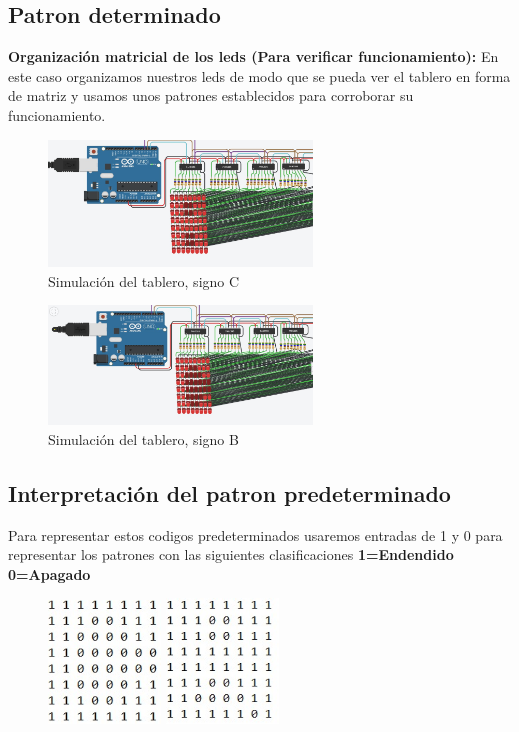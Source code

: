 \documentclass{article}
\begin{document}
\subsection{Patron determinado}
\textbf{Organización matricial de los leds (Para verificar funcionamiento): }
En este caso organizamos nuestros leds de modo que se pueda ver el tablero en forma de matriz y usamos unos patrones establecidos para corroborar su funcionamiento. 
 
\begin{figure}[h]
\includegraphics[width=7cm]{imagen2.jpeg}
\caption{Simulación del tablero, signo C}
\label{fig:imagen2}
\end{figure}

\begin{figure}[h]
\includegraphics[width=7cm]{imagen3.jpeg}
\caption{Simulación del tablero, signo B}
\label{fig:imagen3}
\end{figure}


\subsection{Interpretación del patron predeterminado}
Para representar estos codigos predeterminados usaremos entradas de 1 y 0 para representar los patrones con las siguientes clasificaciones
\textbf{1=Endendido}
\textbf{0=Apagado}

\vspace{0.7cm}
\begin{figure}[h]
\centering
{}
\label{fig:imagenC}
\includegraphics[width=3cm]{imagenC.jpeg}
\label{fig:imagenB}
\includegraphics[width=3cm]{imagenB.jpeg}
\end{figure}
\end{document}
